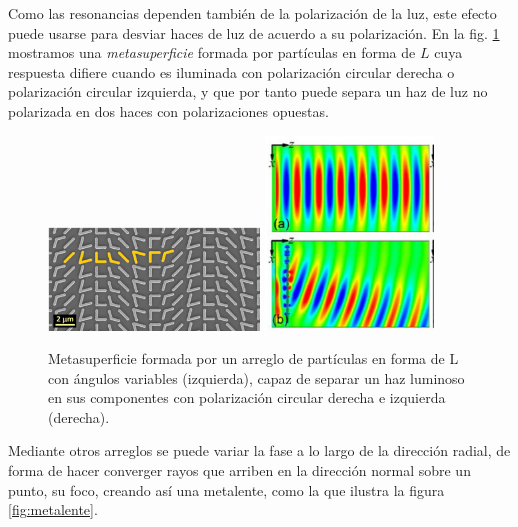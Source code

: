 \documentclass[12pt]{article}
\begin{document}
Como las resonancias dependen también de la polarización de la luz,
este efecto puede usarse para desviar haces de luz de acuerdo a su
polarización. En la fig. \ref{fig:metasup} mostramos una {\em
  metasuperficie} formada por partículas en forma de $L$ cuya
respuesta difiere cuando es iluminada con polarización circular
derecha o polarización circular izquierda, y que por tanto puede
separa un haz de luz no polarizada en dos haces con polarizaciones
opuestas.
\begin{figure}
  \centering
  \includegraphics[width=0.5\textwidth,angle=90,valign=c]{fig12a}
  \includegraphics[width=0.4\textwidth,valign=c]{fig12b}
  \caption{Metasuperficie formada por un arreglo de partículas en
    forma de L con ángulos variables (izquierda), capaz de separar un
    haz luminoso en sus componentes con polarización circular derecha
    e izquierda (derecha).}
  \label{fig:metasup}
\end{figure}
Mediante otros arreglos se puede variar la fase a lo largo de la
dirección radial, de forma de hacer converger rayos que arriben en la
dirección normal sobre un punto, su foco, creando así una metalente,
como la que ilustra la figura \ref{fig:metalente}.
\end{document}
